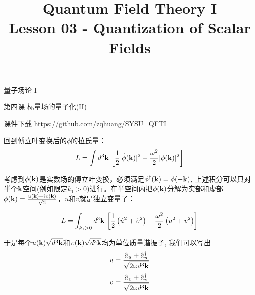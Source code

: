 \documentclass[CJK]{beamer}
\title{Quantum Field Theory I \\ Lesson 03 - Quantization of Scalar Fields}
\author{}
\date{}
\begin{document}
\begin{frame}
 
\begin{center}
\begin{Large}
\bch
量子场论 I 

{\vskip 0.3in}

第四课 标量场的量子化(II)

\ech
\end{Large}
\end{center}

\vskip 0.2in

\bch
课件下载
\ech
https://github.com/zqhuang/SYSU\_QFTI

\end{frame}



\begin{frame}
\bch
回到傅立叶变换后的$\phi$的拉氏量：
$$L = \int d^3\mathbf{k}\, \left[\frac{1}{2}|\dot\phi(\mathbf{k})|^2 - \frac{\omega^2}{2}|\phi(\mathbf{k})|^2\right]$$
\skipline

考虑到$\phi(\mathbf{k})$是实数场的傅立叶变换，必须满足$\phi^\dagger(\mathbf{k}) = \phi(-\mathbf{k})$, 上述积分可以只对半个$\mathbf{k}$空间(例如限定$k_1>0$)进行。在半空间内把$\phi(\mathbf{k})$分解为实部和虚部$\phi(\mathbf{k}) = \frac{u(\mathbf{k}) + i \upsilon(\mathbf{k})}{\sqrt{2}}$，$u$和$v$就是独立变量了：

\skipline
$$L = \int_{k_1>0} d^3\mathbf{k}\,\left[ \frac{1}{2}\left(\dot u^2 + \dot {\upsilon}^2 \right) - \frac{\omega^2}{2}\left(u^2+v^2\right)\right]$$

\ech

\end{frame}

\begin{frame}
\bch
于是每个$u(\mathbf{k})\sqrt{d^3\mathbf{k}}$和$\upsilon(\mathbf{k})\sqrt{d^3\mathbf{k}}$均为单位质量谐振子, 我们可以写出
$$u  = \frac{\hat{a}_u + {\hat{a}^\dagger}_u}{\sqrt{2\omega d^3\mathbf{k}}}$$
$$\upsilon  = \frac{\hat{a}_{\upsilon} + {\hat{a}^\dagger}_{\upsilon}}{\sqrt{2\omega d^3\mathbf{k}}}$$
\ech
\end{frame}
\end{document}
